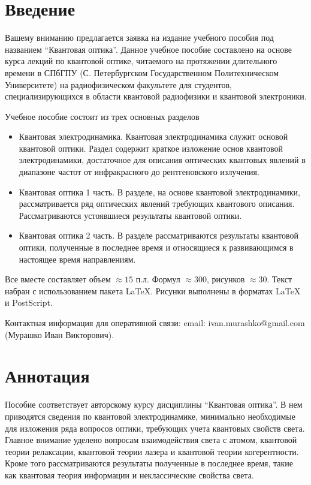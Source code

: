 


\Russian
\pagestyle{empty}


\section*{Введение}
Вашему вниманию предлагается заявка на издание учебного пособия под
названием ``Квантовая оптика''. Данное учебное пособие составлено на
основе курса лекций по квантовой оптике, читаемого на 
протяжении длительного времени в СПбГПУ (С. Петербургском
Государственном Политехническом Университете) на радиофизическом
факультете для студентов, специализирующихся в области квантовой
радиофизики и квантовой электроники.

Учебное пособие состоит из трех основных разделов
\begin{itemize}
\item Квантовая электродинамика. Квантовая электродинамика служит
  основой квантовой оптики. Раздел 
содержит краткое изложение основ квантовой электродинамики,
достаточное для описания оптических квантовых явлений в диапазоне
частот от инфракрасного до рентгеновского излучения.
\item Квантовая оптика 1 часть. В разделе, на основе квантовой
  электродинамики, рассматривается ряд оптических явлений требующих
  квантового описания. Рассматриваются устоявшиеся результаты
  квантовой оптики.
\item Квантовая оптика 2 часть. В разделе рассматриваются результаты
  квантовой оптики, полученные в последнее время и относящиеся к
  развивающимся в настоящее время направлениям.
\end{itemize}
Все вместе составляет объем \(\approx 15\) п.л. Формул \(\approx
300\), рисунков \(\approx 30\). Текст
набран с использованием пакета \LaTeX. Рисунки выполнены в
форматах {\LaTeX} и PostScript.

Контактная информация для оперативной связи: email:
ivan.murashko@gmail.com (Мурашко Иван Викторович). 

\newpage

\section{Аннотация}
Пособие соответствует авторскому курсу дисциплины ``Квантовая
оптика''. В нем приводятся сведения по квантовой электродинамике,
минимально необходимые для изложения ряда вопросов оптики,
требующих учета квантовых свойств света. Главное внимание уделено
вопросам взаимодействия света с атомом, квантовой теории релаксации,
квантовой теории лазера и квантовой теории когерентности. Кроме того
рассматриваются результаты полученные в последнее время, такие как
квантовая теория информации и неклассические свойства света.

